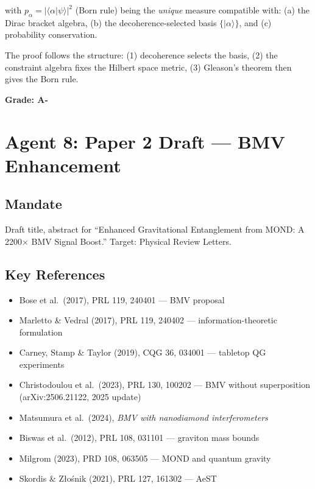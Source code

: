 \documentclass[11pt,a4paper]{article}
\begin{document}
with $p_\alpha = |\langle\alpha|\psi\rangle|^2$ (Born rule) being the \emph{unique} measure compatible with:
(a) the Dirac bracket algebra,
(b) the decoherence-selected basis $\{|\alpha\rangle\}$, and
(c) probability conservation.

The proof follows the structure: (1) decoherence selects the basis, (2) the constraint algebra fixes the Hilbert space metric, (3) Gleason's theorem then gives the Born rule.

\textbf{Grade: A-}

\section{Agent 8: Paper 2 Draft --- BMV Enhancement}
\label{sec:agent8}

\subsection{Mandate}

Draft title, abstract for ``Enhanced Gravitational Entanglement from MOND: A 2200$\times$ BMV Signal Boost.'' Target: Physical Review Letters.

\subsection{Key References}

\begin{itemize}
\item Bose et al.\ (2017), PRL 119, 240401 --- BMV proposal
\item Marletto \& Vedral (2017), PRL 119, 240402 --- information-theoretic formulation
\item Carney, Stamp \& Taylor (2019), CQG 36, 034001 --- tabletop QG experiments
\item Christodoulou et al.\ (2023), PRL 130, 100202 --- BMV without superposition (arXiv:2506.21122, 2025 update)
\item Matsumura et al.\ (2024), \emph{BMV with nanodiamond interferometers}
\item Biswas et al.\ (2012), PRL 108, 031101 --- graviton mass bounds
\item Milgrom (2023), PRD 108, 063505 --- MOND and quantum gravity
\item Skordis \& Z{\l}o\'{s}nik (2021), PRL 127, 161302 --- AeST
\end{itemize}
\end{document}
